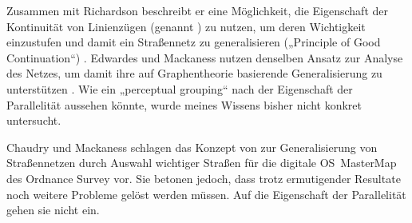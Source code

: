 \documentclass[../main/thesis.tex]{subfiles}
\begin{document}
Zusammen mit Richardson beschreibt er eine Möglichkeit, die Eigenschaft der Kontinuität von Linienzügen (genannt ) zu nutzen, um deren Wichtigkeit einzustufen und damit ein Straßennetz zu generalisieren („Principle of Good Continuation“) . Edwardes und Mackaness nutzen denselben Ansatz zur Analyse des Netzes, um damit ihre auf Graphentheorie basierende Generalisierung zu unterstützen .
Wie ein „perceptual grouping“ nach der Eigenschaft der Parallelität aussehen könnte, wurde meines Wissens bisher nicht konkret untersucht.


Chaudry und Mackaness schlagen das Konzept von  zur Generalisierung von Straßennetzen durch Auswahl wichtiger Straßen für die digitale OS~MasterMap des Ordnance Survey vor. Sie betonen jedoch, dass trotz ermutigender Resultate noch weitere Probleme gelöst werden müssen. Auf die Eigenschaft der Parallelität gehen sie nicht ein. 

\end{document}
